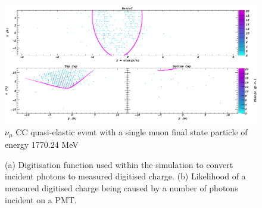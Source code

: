 \begin{figure} %
    \includegraphics[width=\textwidth]{diagrams/4-chips/sim_event.png}
    \caption[sim event short]
    {$\nu_{\mu}$ CC quasi-elastic event with a single muon final state particle of energy
        1770.24 MeV}
    \label{fig:sim_event}
\end{figure}

\begin{figure} %
    \centering
    \quad
    \caption[Simulation PMT digitisaion function.]
    {(a) Digitisation function used within the simulation to convert incident photons to measured
        digitised charge. (b) Likelihood of a measured digitised charge being caused by a number
        of photons incident on a PMT.}
    \label{fig:digitisation}
\end{figure}

